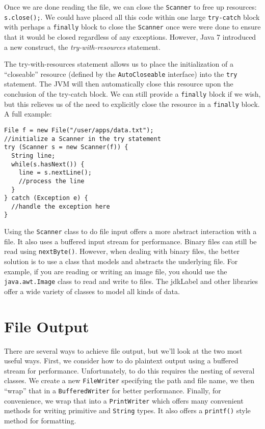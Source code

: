 Once we are done reading the file, we can close the 
\texttt{Scanner} to free up resources:
\texttt{s.close();}.  We could have placed
all this code within one large \texttt{try-catch}
block with perhaps a \texttt{finally} block
to close the \texttt{Scanner} once were were
done to ensure that it would be closed regardless of
any exceptions.  However, Java 7 introduced a new 
construct, the \emph{try-with-resources} statement.

The  try-with-resources statement 
allows us to place
the initialization of a ``closeable'' resource (defined
by the \texttt{AutoCloseable} interface) into
the \texttt{try} statement.  The JVM will then
automatically close this resource upon the conclusion of
the try-catch block.  We can still provide
a \texttt{finally} block if we wish, but this 
relieves us of the need to explicitly close the resource
in a \texttt{finally} block.  A full example:

\begin{verbatim}
File f = new File("/user/apps/data.txt");
//initialize a Scanner in the try statement
try (Scanner s = new Scanner(f)) {
  String line;
  while(s.hasNext()) {
    line = s.nextLine();
	//process the line
  }
} catch (Exception e) {
  //handle the exception here
}
\end{verbatim}

Using the \texttt{Scanner} class to do file 
input offers a more abstract interaction with a file.  
It also uses a buffered input stream for performance.
Binary files can still be read using \texttt{nextByte()}.
However, when dealing with binary files, the better 
solution is to use a class that
models and abstracts the underlying file.  For example, 
if you are reading or writing an image file, you should
use the \texttt{java.awt.Image} class to
read and write to files.  The \gls{jdkLabel} and other
libraries offer a wide variety of classes to model all
kinds of data.

\section{File Output}

There are several ways to achieve file output, 
but we'll look at the two most useful ways.  First,
we consider how to do plaintext output 
using a buffered stream for performance.  Unfortunately,
to do this requires the nesting of several classes. 
We create a new \texttt{FileWriter} specifying
the path and file name, we then ``wrap'' that in a
\texttt{BufferedWriter} for better performance.
Finally, for convenience, we wrap that into a 
\texttt{PrintWriter} which offers many convenient
methods for writing primitive and \texttt{String} 
types.  It also offers a \texttt{printf()} style
method for formatting.

